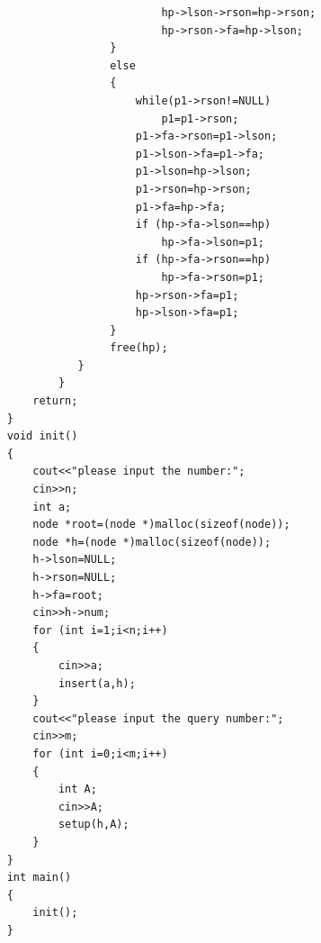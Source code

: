 \documentclass[UTF8,a4paper]{article}
\begin{document}
\begin{lstlisting}
                            hp->lson->rson=hp->rson;
                            hp->rson->fa=hp->lson;
                    }
                    else
                    {
                        while(p1->rson!=NULL)
                            p1=p1->rson;
                        p1->fa->rson=p1->lson;
                        p1->lson->fa=p1->fa;
                        p1->lson=hp->lson;
                        p1->rson=hp->rson;
                        p1->fa=hp->fa;
                        if (hp->fa->lson==hp)
                            hp->fa->lson=p1;
                        if (hp->fa->rson==hp)
                            hp->fa->rson=p1;
                        hp->rson->fa=p1;
                        hp->lson->fa=p1;
                    }
                    free(hp);
               }
            }
        return;
    }
    void init()
    {
        cout<<"please input the number:";
        cin>>n;
        int a;
        node *root=(node *)malloc(sizeof(node));
        node *h=(node *)malloc(sizeof(node));
        h->lson=NULL;
        h->rson=NULL;
        h->fa=root;
        cin>>h->num;
        for (int i=1;i<n;i++)
        {
            cin>>a;
            insert(a,h);
        }
        cout<<"please input the query number:";
        cin>>m;
        for (int i=0;i<m;i++)
        {
            int A;
            cin>>A;
            setup(h,A);
        }
    }
    int main()
    {
        init();
    }
\end{lstlisting}
\end{document}
